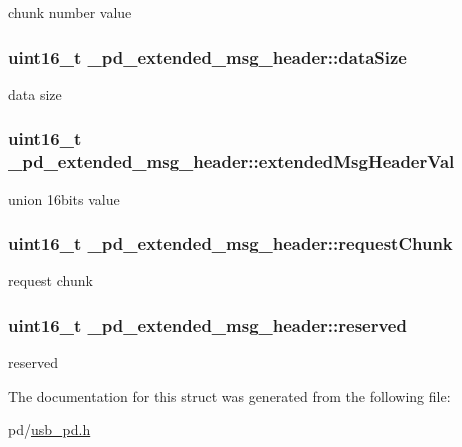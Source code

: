 chunk number value \hypertarget{struct__pd__extended__msg__header_a2de7ab0aad3f2a5d43ac2fab21faa472}{
\subsubsection[{data\-Size}]{\setlength{\rightskip}{0pt plus 5cm}uint16\-\_\-t \-\_\-pd\-\_\-extended\-\_\-msg\-\_\-header\-::data\-Size}}\label{struct__pd__extended__msg__header_a2de7ab0aad3f2a5d43ac2fab21faa472}
data size \hypertarget{struct__pd__extended__msg__header_a1d247099ea671c66798b32e603697c5d}{
\subsubsection[{extended\-Msg\-Header\-Val}]{\setlength{\rightskip}{0pt plus 5cm}uint16\-\_\-t \-\_\-pd\-\_\-extended\-\_\-msg\-\_\-header\-::extended\-Msg\-Header\-Val}}\label{struct__pd__extended__msg__header_a1d247099ea671c66798b32e603697c5d}
union 16bits value \hypertarget{struct__pd__extended__msg__header_a56118ebd135557a535235ec18d34eea8}{
\subsubsection[{request\-Chunk}]{\setlength{\rightskip}{0pt plus 5cm}uint16\-\_\-t \-\_\-pd\-\_\-extended\-\_\-msg\-\_\-header\-::request\-Chunk}}\label{struct__pd__extended__msg__header_a56118ebd135557a535235ec18d34eea8}
request chunk \hypertarget{struct__pd__extended__msg__header_a8480a71ff4037e27738e81c01dfd6b0d}{
\subsubsection[{reserved}]{\setlength{\rightskip}{0pt plus 5cm}uint16\-\_\-t \-\_\-pd\-\_\-extended\-\_\-msg\-\_\-header\-::reserved}}\label{struct__pd__extended__msg__header_a8480a71ff4037e27738e81c01dfd6b0d}
reserved 

The documentation for this struct was generated from the following file\-:\begin{DoxyCompactItemize}
\item 
pd/\hyperlink{usb__pd_8h}{usb\-\_\-pd.\-h}\end{DoxyCompactItemize}
